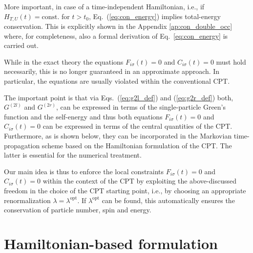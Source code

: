 \documentclass[twocolumn,prb,showpacs,aps,superscriptaddress]{revtex4}
\begin{document}
More important, in case of a time-independent Hamiltonian, i.e., if $H_{T,U}(t)=\mathrm{const.}$ for $t > t_0$, Eq.\  (\ref{eq:con_energy}) implies total-energy conservation. 
This is explicitly shown in the Appendix \ref{ap:con_double_occ} where, for completeness, also a formal derivation of
Eq.\ \eqref{eq:con_energy} is carried out.

While in the exact theory the equations $F_{i\sigma}(t)=0$ and $C_{i\sigma}(t)=0$ must hold necessarily, this is no longer guaranteed in an approximate approach. 
In particular, the equations are usually violated within the conventional CPT. 

The important point is that via Eqs.\ (\ref{eq:g2l_def}) and (\ref{eq:g2r_def}) both, $G^{(2l)}$ and $G^{(2r)}$, can be expressed in terms of the single-particle Green's function and the self-energy and thus both equations $F_{i\sigma}(t)=0$ and $C_{i\sigma}(t)=0$ can be expressed in terms of the central quantities of the CPT. 
Furthermore, as is shown below, they can be incorporated in the Markovian time-propagation scheme based on the Hamiltonian formulation of the CPT. 
The latter is essential for the numerical treatment.

Our main idea is thus to enforce the local constraints $F_{i\sigma}(t)=0$ and $C_{i\sigma}(t)=0$ within the context of the CPT by exploiting the above-discussed freedom in the choice of the CPT starting point, i.e., by choosing an appropriate renormalization $\lambda = \lambda^\mathrm{opt}$.
If $\lambda^\mathrm{opt}$ can be found, this automatically ensures the conservation of particle number, spin and energy. 

\section{Hamiltonian-based formulation}
\label{sec:hamiltonian_based}
\end{document}
